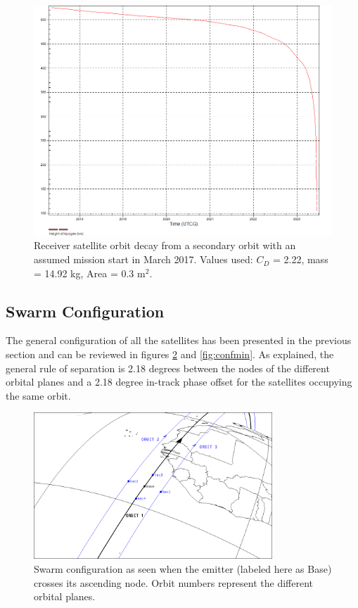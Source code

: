 \begin{landscape}
\begin{figure}[ht!]
\centering
\includegraphics[width = \textheight]{chapters/img/receiverDecay2nd.png}
\caption{Receiver satellite orbit decay from a secondary orbit with an assumed mission start in March 2017. Values used: $C_D$ = 2.22, mass = 14.92 kg, Area = 0.3 m$^2$.}
\label{fig:recLife2}
\end{figure}
\end{landscape}

\subsection{Swarm Configuration}
\label{frSSSC}

The general configuration of all the satellites has been presented in the previous section and can be reviewed in figures \ref{fig:confmax} and \ref{fig:confmin}. As explained, the general rule of separation is 2.18 degrees between the nodes of the different orbital planes and a 2.18 degree in-track phase offset for the satellites occupying the same orbit. 

\begin{figure}[!h]
\centering
\includegraphics[width=0.8\textwidth, angle=0]{chapters/img/primaryconfmax.png}
\caption{Swarm configuration as seen when the emitter (labeled here as Base) crosses its ascending node. Orbit numbers represent the different orbital planes.}
\label{fig:confmax}
\end{figure}

